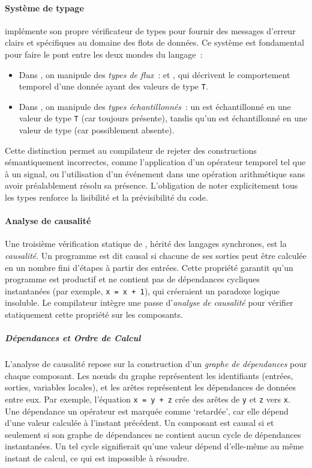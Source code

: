 \paragraph{Système de typage} \GRust implémente son propre vérificateur de types pour fournir des
messages d'erreur clairs et spécifiques au domaine des flots de données. Ce système est fondamental
pour faire le pont entre les deux mondes du langage~:
\begin{itemize}
      \item Dans \GRFRP, on manipule des \emph{types de flux}~:  et
            , qui décrivent le comportement temporel d'une donnée ayant des
            valeurs de type \texttt{T}.
      \item Dans \GRSync, on manipule des \emph{types échantillonnés}~: un  est
            échantillonné en une valeur de type \texttt{T} (car toujours présente), tandis qu'un
             est échantillonné en une valeur de type 
            (car possiblement absente).
\end{itemize}
Cette distinction permet au compilateur de rejeter des constructions sémantiquement incorrectes,
comme l'application d'un opérateur temporel tel que  à un signal, ou l'utilisation
d'un événement dans une opération arithmétique sans avoir préalablement résolu sa présence.
L'obligation de noter explicitement tous les types renforce la lisibilité et la prévisibilité du
code.

\paragraph{Analyse de causalité} Une troisième vérification statique de \GRust, hérité des langages
synchrones, est la \emph{causalité}. Un programme est dit causal si chacune de ses sorties peut être
calculée en un nombre fini d'étapes à partir des entrées. Cette propriété garantit qu'un programme
est productif et ne contient pas de dépendances cycliques instantanées (par exemple,
\texttt{x = x + 1}), qui créeraient un paradoxe logique insoluble. Le compilateur \GRust intègre une
passe d'\emph{analyse de causalité} pour vérifier statiquement cette propriété sur les composants.

\subparagraph{Dépendances et Ordre de Calcul} L'analyse de causalité repose sur la construction d'un
\emph{graphe de dépendances} pour chaque composant. Les nœuds du graphe représentent les
identifiants (entrées, sorties, variables locales), et les arêtes représentent les dépendances de
données entre eux. Par exemple, l'équation \texttt{x = y + z} crée des arêtes de \texttt{y} et
\texttt{z} vers \texttt{x}. Une dépendance \via un opérateur  est marquée comme
`retardée', car elle dépend d'une valeur calculée à l'instant précédent.
%
Un composant est causal si et seulement si son graphe de dépendances ne contient aucun cycle de
dépendances instantanées. Un tel cycle signifierait qu'une valeur dépend d'elle-même au même instant
de calcul, ce qui est impossible à résoudre.


